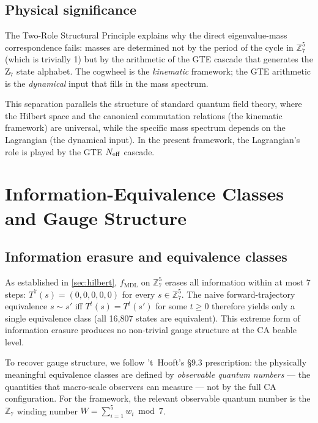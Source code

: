 \documentclass[11pt]{article}
\theoremstyle{remark}
\newcommand{\GTE}{\text{GTE}}
\newcommand{\MDL}{\text{MDL}}
\newcommand{\Neff}{N_{\rm eff}}
\begin{document}
\subsection{Physical significance}
\label{ssec:two_role_physics}

The Two-Role Structural Principle explains why the direct eigenvalue-mass
correspondence fails: masses are determined not by the period of the
cycle in $\mathbb{Z}_7^5$ (which is trivially 1) but by the arithmetic
of the GTE cascade that generates the Z$_7$ state alphabet.
The cogwheel is the \emph{kinematic} framework; the GTE arithmetic is
the \emph{dynamical} input that fills in the mass spectrum.

This separation parallels the structure of standard quantum field theory,
where the Hilbert space and the canonical commutation relations (the
kinematic framework) are universal, while the specific mass spectrum
depends on the Lagrangian (the dynamical input).
In the present framework, the Lagrangian's role is played by the GTE
$\Neff$ cascade.

\section{Information-Equivalence Classes and Gauge Structure}
\label{sec:gauge}

\subsection{Information erasure and equivalence classes}
\label{ssec:erasure}

As established in \cref{sec:hilbert}, $f_{\MDL}$ on $\mathbb{Z}_7^5$
erases all information within at most 7 steps: $T^7(s) =
(0,0,0,0,0)$ for every $s \in \mathbb{Z}_7^5$.
The naive forward-trajectory equivalence $s \sim s'$ iff
$T^t(s) = T^t(s')$ for some $t \geq 0$ therefore yields only a
single equivalence class (all 16{,}807 states are equivalent).
This extreme form of information erasure produces no non-trivial
gauge structure at the CA beable level.

To recover gauge structure, we follow 't~Hooft's \S9.3 prescription:
the physically meaningful equivalence classes are defined by
\emph{observable quantum numbers} --- the quantities that
macro-scale observers can measure --- not by the full CA configuration.
For the \GTE{} framework, the relevant observable quantum number
is the $\mathbb{Z}_7$ winding number $W = \sum_{i=1}^5 w_i \bmod 7$.
\end{document}
